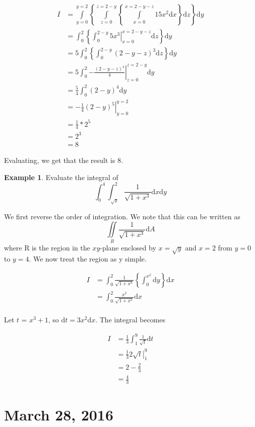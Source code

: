 \documentclass[11pt]{article}
\theoremstyle{plain} %
\theoremstyle{definition}
\theoremstyle{example}
\newtheorem*{example}{Example}
\theoremstyle{remark}
\begin{document}
\begin{align*}
	I& = \int\limits_{y=0}^{y=2} \left\{\int\limits_{z=0}^{z=2-y} \left\{\int\limits_{x=0}^{x=2-y-z}15x^2 \mathrm d x\right\}\mathrm d z \right\}\mathrm d y\\
	&= \int_{0}^{2} \left\{\int_{0}^{2-y} \left.5x^3\right|_{x=0}^{x=2-y-z} \mathrm d z \right\}\mathrm d y\\
	&= 5\int_{0}^{2} \left\{\int_{0}^{2-y} (2-y-z)^3 \mathrm d z \right\}\mathrm d y\\
	&= 5\int_{0}^{2} \left.-\frac{(2-y-z)^4}{4}\right|_{z=0}^{z=2-y} \mathrm d y\\
	&= \frac{5}{4} \int_0^2(2-y)^4\mathrm d y\\
	&= -\frac{1}{4} \left.(2-y)^5\right|_{y=0}^{y=2}\\
	&= \frac{1}{4}*2^5\\
	&= 2^3\\
	&= 8
\end{align*}


Evaluating, we get that the result is 8.

\begin{example}
Evaluate the integral of $$\int_0^4 \int_{\sqrt y}^2 \frac{1}{\sqrt{1+x^3}} \mathrm d x \mathrm d y$$
\end{example}

We first reverse the order of integration. We note that this can be written as $$\iint\limits_R \frac{1}{\sqrt{1+x^3}} \mathrm d A$$ where R is the region in the $xy$-plane enclosed by $x = \sqrt y$ and $x = 2$ from $y = 0$ to $y = 4$. We now treat the region as y simple. 

\begin{align*}
I &= \int_0^2  \frac{1}{\sqrt{1+x^3}} \left\{\int_0^{x^2} \mathrm d y \right\}\mathrm d x\\
&= \int_0^2 \frac{x^2}{\sqrt{1+x^3}}\mathrm d x\\
\end{align*}

Let $t$ = $x^3+1$, so $\mathrm d t = 3x^2 \mathrm d x$. The integral becomes

\begin{align*}
I &= \frac{1}{3}\int_1^9\frac{1}{\sqrt{t}}\mathrm d t\\
&= \frac{1}{3}\left.2\sqrt{t}\right|_1^9\\
&= 2-\frac{2}{3}\\
&= \frac{4}{3}
\end{align*}


\section{March 28, 2016}
\end{document}
